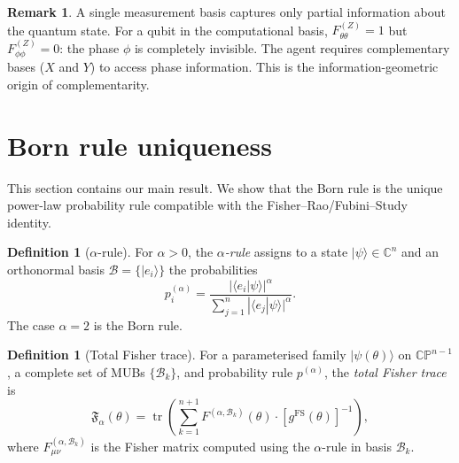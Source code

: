 \documentclass[12pt,a4paper]{article}
\theoremstyle{definition}
\newtheorem{definition}[theorem]{Definition}
\newtheorem{remark}[theorem]{Remark}
\newcommand{\tr}{\operatorname{tr}}
\newcommand{\C}{\mathbb{C}}
\newcommand{\CP}{\mathbb{CP}}
\newcommand{\Bcal}{\mathcal{B}}
\newcommand{\ket}[1]{| #1 \rangle}
\begin{document}
\begin{remark}
  \label{rem:single-basis}
  A single measurement basis captures only partial information about
  the quantum state. For a qubit in the computational basis,
  $F^{(Z)}_{\theta\theta} = 1$ but $F^{(Z)}_{\phi\phi} = 0$:
  the phase $\phi$ is completely invisible. The agent requires
  complementary bases ($X$ and $Y$) to access phase information. This
  is the information-geometric origin of complementarity.
\end{remark}

\section{Born rule uniqueness}
\label{sec:born}

This section contains our main result. We show that the Born rule is
the unique power-law probability rule compatible with the
Fisher--Rao/Fubini--Study identity.

\begin{definition}[$\alpha$-rule]
  \label{def:alpha-rule}
  For $\alpha > 0$, the \emph{$\alpha$-rule} assigns to a state
  $\ket{\psi} \in \C^n$ and an orthonormal basis
  $\Bcal = \{\ket{e_i}\}$ the probabilities
  \begin{equation}
    p_i^{(\alpha)}
    = \frac{|\langle e_i | \psi \rangle|^\alpha}
           {\sum_{j=1}^n |\langle e_j | \psi \rangle|^\alpha}.
  \end{equation}
  The case $\alpha = 2$ is the Born rule.
\end{definition}

\begin{definition}[Total Fisher trace]
  \label{def:fisher-trace}
  For a parameterised family $\ket{\psi(\theta)}$ on $\CP^{n-1}$, a
  complete set of MUBs $\{\Bcal_k\}$, and probability rule
  $p^{(\alpha)}$, the \emph{total Fisher trace} is
  \begin{equation}
    \mathfrak{F}_\alpha(\theta)
    = \tr\!\left(
        \sum_{k=1}^{n+1} F^{(\alpha,\Bcal_k)}(\theta)
        \cdot \left[g^{\mathrm{FS}}(\theta)\right]^{-1}
      \right),
  \end{equation}
  where $F^{(\alpha,\Bcal_k)}_{\mu\nu}$ is the Fisher matrix
  computed using the $\alpha$-rule in basis $\Bcal_k$.
\end{definition}
\end{document}
